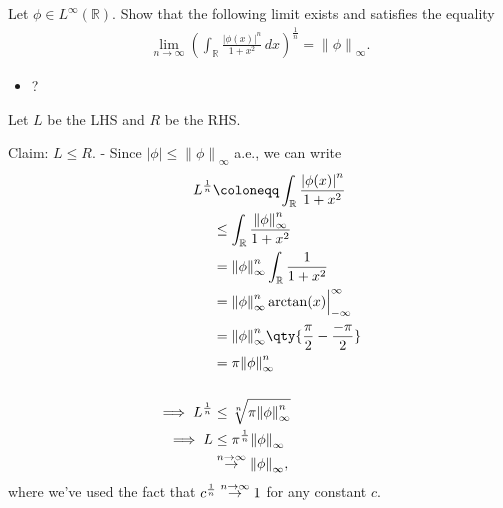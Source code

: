 Let \(\phi\in L^\infty({\mathbb{R}})\). Show that the following limit
exists and satisfies the equality
\begin{align*}
\lim _{n \to \infty} \left(\int _{\mathbb{R}} \frac{|\phi(x)|^{n}}{1+x^{2}} \, dx \right) ^ {\frac{1}{n}} 
= {\left\lVert {\phi} \right\rVert}_\infty.
\end{align*}

\begin{solution}

\envlist

\begin{concept}

\envlist

\begin{itemize}
\tightlist
\item
  ?
\end{itemize}

\end{concept}

Let \(L\) be the LHS and \(R\) be the RHS.

Claim: \(L\leq R\). - Since
\({\left\lvert {\phi } \right\rvert}\leq {\left\lVert {\phi} \right\rVert}_\infty\)
a.e., we can write
\begin{align*}  
  L^{1\over n} 
  &\coloneqq\int_{\mathbb{R}}{ {\left\lvert {\phi(x)} \right\rvert}^n \over 1+ x^2} \\
  &\leq \int_{\mathbb{R}}{ {\left\lVert {\phi} \right\rVert}_\infty^n \over 1+ x^2}  \\
  &= {\left\lVert {\phi} \right\rVert}_\infty^n \int_{\mathbb{R}}{1\over 1 + x^2} \\
  &= {\left\lVert {\phi} \right\rVert}_\infty^n \arctan(x)\Big|_{-\infty}^{\infty}  \\
  &= {\left\lVert {\phi} \right\rVert}_\infty^n \qty{{\pi \over 2} - {-\pi \over 2} }  \\
  &= \pi {\left\lVert {\phi} \right\rVert}_\infty^n \\ \\
  \implies L^{1\over n} &\leq \sqrt[n]{\pi {\left\lVert {\phi} \right\rVert}_\infty^n} \\ 
  \implies L &\leq \pi^{1\over n} {\left\lVert {\phi} \right\rVert}_\infty \\
  &\overset{n\to \infty }\to {\left\lVert {\phi} \right\rVert}_\infty
  ,\end{align*}
where we've used the fact that
\(c^{1\over n} \overset{n\to\infty}\to 1\) for any constant \(c\).


\end{solution}
